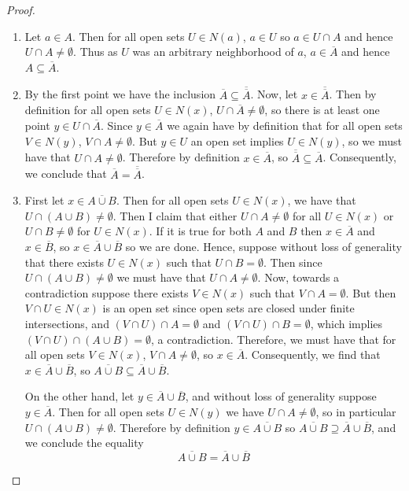 \documentclass[12pt, a4paper, oneside, openright, titlepage]{book}
\begin{document}
\begin{proof}
    \leavevmode
    \begin{enumerate}
        \item Let $a \in A$. Then for all open sets $U \in N(a)$, $a \in U$ so $a \in U\cap A$ and hence $U\cap A \neq \emptyset$. Thus as $U$ was an arbitrary neighborhood of $a$, $a \in \overline{A}$ and hence $A \subseteq \overline{A}$.
        \item By the first point we have the inclusion $\overline{A} \subseteq \overline{\overline{A}}$. Now, let $x \in \overline{\overline{A}}$. Then by definition for all open sets $U \in N(x)$, $U \cap \overline{A} \neq \emptyset$, so there is at least one point $y \in U \cap \overline{A}$. Since $y \in \overline{A}$ we again have by definition that for all open sets $V \in N(y)$, $V \cap A \neq \emptyset$. But $y \in U$ an open set implies $U \in N(y)$, so we must have that $U \cap A \neq \emptyset$. Therefore by definition $x \in \overline{A}$, so $\overline{\overline{A}} \subseteq \overline{A}$. Consequently, we conclude that $\overline{A} = \overline{\overline{A}}$.
        \item First let $x \in \overline{A\cup B}$. Then for all open sets $U \in N(x)$, we have that $U \cap(A\cup B) \neq \emptyset$. Then I claim that either $U\cap A \neq \emptyset$ for all $U \in N(x)$ or $U\cap B \neq \emptyset$ for $U \in N(x)$. If it is true for both $A$ and $B$ then $x \in \overline{A}$ and $x \in \overline{B}$, so $x \in \overline{A}\cup\overline{B}$ so we are done. Hence, suppose without loss of generality that there exists $U \in N(x)$ such that $U\cap B = \emptyset$. Then since $U\cap(A\cup B) \neq \emptyset$ we must have that $U \cap A\neq \emptyset$. Now, towards a contradiction suppose there exists $V \in N(x)$ such that $V\cap A = \emptyset$. But then $V\cap U \in N(x)$ is an open set since open sets are closed under finite intersections, and $(V\cap U)\cap A = \emptyset$ and $(V\cap U)\cap B = \emptyset$, which implies $(V\cap U)\cap (A\cup B) = \emptyset$, a contradiction. Therefore, we must have that for all open sets $V \in N(x)$, $V\cap A \neq \emptyset$, so $x \in \overline{A}$. Consequently, we find that $x \in \overline{A}\cup\overline{B}$, so $\overline{A\cup B} \subseteq \overline{A}\cup\overline{B}$.

            On the other hand, let $y \in \overline{A} \cup \overline{B}$, and without loss of generality suppose $y \in \overline{A}$. Then for all open sets $U \in N(y)$ we have $U \cap A \neq \emptyset$, so in particular $U \cap (A\cup B) \neq \emptyset$. Therefore by definition $y \in \overline{A\cup B}$ so $\overline{A\cup B}\supseteq \overline{A}\cup\overline{B}$, and we conclude the equality $$\overline{A\cup B} = \overline{A}\cup\overline{B}$$


\end{enumerate}
\end{proof}
\end{document}
